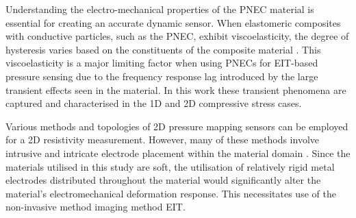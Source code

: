 Understanding the electro-mechanical properties of the PNEC material is essential for creating an accurate dynamic sensor. When elastomeric composites with conductive particles, such as the PNEC, exhibit viscoelasticity, the degree of hysteresis varies based on the constituents of the composite material \citep{Ellingham2021}. This viscoelasticity is a major limiting factor when using PNECs for EIT-based pressure sensing due to the frequency response lag introduced by the large transient effects seen in the material. In this work these transient phenomena are captured and characterised in the 1D and 2D compressive stress cases.


Various methods and topologies of 2D pressure mapping sensors can be employed for a 2D resistivity measurement. However, many of these methods involve intrusive and intricate electrode placement within the material domain \citep{Goncalves2017,Loew2019,Silvera-Tawil2015,Lee2019,Gilanizadehdizaj2022,Zhu2021}. Since the materials utilised in this study are soft, the utilisation of relatively rigid metal electrodes distributed throughout the material would significantly alter the material's electromechanical deformation response. This necessitates use of the non-invasive method imaging method EIT. 



